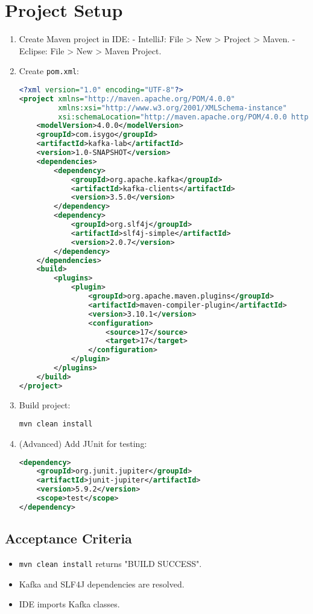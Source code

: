 \documentclass[12pt,a4paper]{report}
\begin{document}
\section{Project Setup}
\begin{enumerate}
    \item Create Maven project in IDE:
       - IntelliJ: File > New > Project > Maven.
       - Eclipse: File > New > Maven Project.
    \item Create \texttt{pom.xml}:
\begin{lstlisting}[language=xml]
<?xml version="1.0" encoding="UTF-8"?>
<project xmlns="http://maven.apache.org/POM/4.0.0"
         xmlns:xsi="http://www.w3.org/2001/XMLSchema-instance"
         xsi:schemaLocation="http://maven.apache.org/POM/4.0.0 http://maven.apache.org/xsd/maven-4.0.0.xsd">
    <modelVersion>4.0.0</modelVersion>
    <groupId>com.isygo</groupId>
    <artifactId>kafka-lab</artifactId>
    <version>1.0-SNAPSHOT</version>
    <dependencies>
        <dependency>
            <groupId>org.apache.kafka</groupId>
            <artifactId>kafka-clients</artifactId>
            <version>3.5.0</version>
        </dependency>
        <dependency>
            <groupId>org.slf4j</groupId>
            <artifactId>slf4j-simple</artifactId>
            <version>2.0.7</version>
        </dependency>
    </dependencies>
    <build>
        <plugins>
            <plugin>
                <groupId>org.apache.maven.plugins</groupId>
                <artifactId>maven-compiler-plugin</artifactId>
                <version>3.10.1</version>
                <configuration>
                    <source>17</source>
                    <target>17</target>
                </configuration>
            </plugin>
        </plugins>
    </build>
</project>
\end{lstlisting}
    \item Build project:
    \begin{lstlisting}
mvn clean install
    \end{lstlisting}
    \item (Advanced) Add JUnit for testing:
\begin{lstlisting}[language=xml]
<dependency>
    <groupId>org.junit.jupiter</groupId>
    <artifactId>junit-jupiter</artifactId>
    <version>5.9.2</version>
    <scope>test</scope>
</dependency>
\end{lstlisting}
\end{enumerate}

\subsection{Acceptance Criteria}
\begin{itemize}
    \item \texttt{mvn clean install} returns "BUILD SUCCESS".
    \item Kafka and SLF4J dependencies are resolved.
    \item IDE imports Kafka classes.
\end{itemize}
\end{document}
